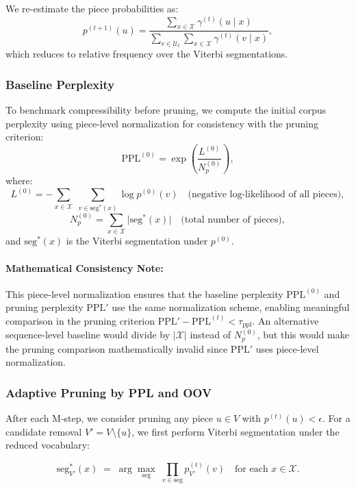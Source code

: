 We re-estimate the piece probabilities as:
\[
p^{(t+1)}(u)
= \frac{
	\sum_{x \in \mathcal X} \gamma^{(t)}(u \mid x)
}{
	\sum_{v \in \mathcal U_t} \sum_{x \in \mathcal X} \gamma^{(t)}(v \mid x)
},
\]
which reduces to relative frequency over the Viterbi segmentations.

\subsubsection{Baseline Perplexity}

To benchmark compressibility before pruning, we compute the initial corpus perplexity using piece-level normalization for consistency with the pruning criterion:
\[
\mathrm{PPL}^{(0)}
= \exp\left(
\frac{L^{(0)}}{N_{p}^{(0)}}
\right),
\]
where:
\[
L^{(0)} = -\sum_{x\in\mathcal X}\;\sum_{v\in\mathrm{seg}^{*}(x)}\log p^{(0)}(v)
\quad\text{(negative log-likelihood of all pieces)},
\]
\[
N_{p}^{(0)} = \sum_{x\in\mathcal X} \bigl|\mathrm{seg}^{*}(x)\bigr|
\quad\text{(total number of pieces)},
\]
and \(\mathrm{seg}^{*}(x)\) is the Viterbi segmentation under \(p^{(0)}\).

\paragraph{Mathematical Consistency Note:} 
This piece-level normalization ensures that the baseline perplexity \(\mathrm{PPL}^{(0)}\) and pruning perplexity \(\mathrm{PPL}'\) use the same normalization scheme, enabling meaningful comparison in the pruning criterion \(\mathrm{PPL}' - \mathrm{PPL}^{(t)} < \tau_{\mathrm{ppl}}\). An alternative sequence-level baseline would divide by \(|\mathcal X|\) instead of \(N_{p}^{(0)}\), but this would make the pruning comparison mathematically invalid since \(\mathrm{PPL}'\) uses piece-level normalization.







\subsubsection{Adaptive Pruning by PPL and OOV}

After each M‐step, we consider pruning any piece \(u\in V\) with \(p^{(t)}(u)<\epsilon\).  For a candidate removal \(V' = V \setminus \{u\}\), we first perform Viterbi segmentation under the reduced vocabulary:

\[
\mathrm{seg}^{*}_{V'}(x) \;=\;\arg\max_{\mathrm{seg}} \;\prod_{v\in\mathrm{seg}} p^{(t)}_{V'}(v)
\quad\text{for each }x\in\mathcal X.
\]

